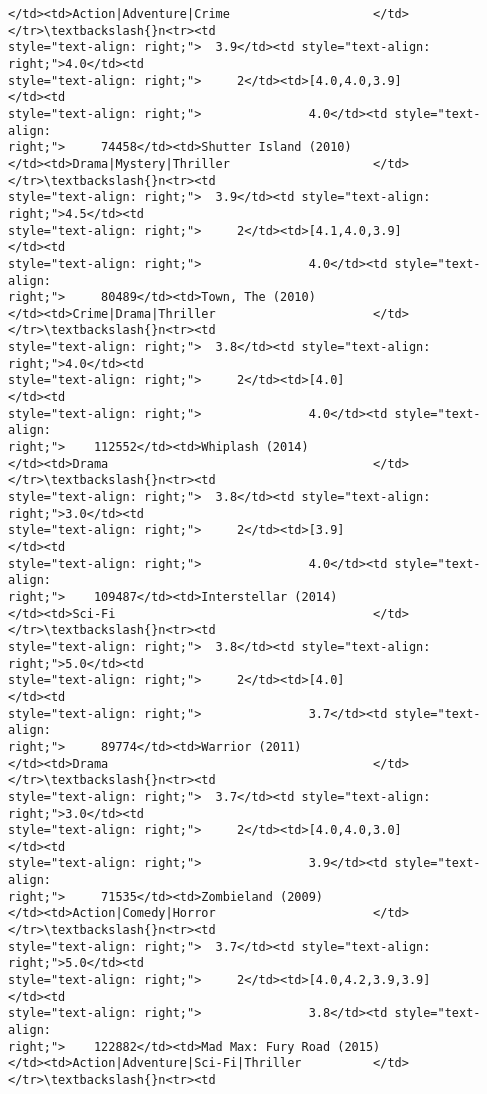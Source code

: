 \documentclass[11pt]{article}
\begin{document}
\begin{tcolorbox}[breakable, size=fbox, boxrule=.5pt, pad at break*=1mm, opacityfill=0]
\begin{Verbatim}[commandchars=\\\{\}]
</td><td>Action|Adventure|Crime                    </td></tr>\textbackslash{}n<tr><td
style="text-align: right;">  3.9</td><td style="text-align: right;">4.0</td><td
style="text-align: right;">     2</td><td>[4.0,4.0,3.9]            </td><td
style="text-align: right;">               4.0</td><td style="text-align:
right;">     74458</td><td>Shutter Island (2010)
</td><td>Drama|Mystery|Thriller                    </td></tr>\textbackslash{}n<tr><td
style="text-align: right;">  3.9</td><td style="text-align: right;">4.5</td><td
style="text-align: right;">     2</td><td>[4.1,4.0,3.9]            </td><td
style="text-align: right;">               4.0</td><td style="text-align:
right;">     80489</td><td>Town, The (2010)
</td><td>Crime|Drama|Thriller                      </td></tr>\textbackslash{}n<tr><td
style="text-align: right;">  3.8</td><td style="text-align: right;">4.0</td><td
style="text-align: right;">     2</td><td>[4.0]                    </td><td
style="text-align: right;">               4.0</td><td style="text-align:
right;">    112552</td><td>Whiplash (2014)
</td><td>Drama                                     </td></tr>\textbackslash{}n<tr><td
style="text-align: right;">  3.8</td><td style="text-align: right;">3.0</td><td
style="text-align: right;">     2</td><td>[3.9]                    </td><td
style="text-align: right;">               4.0</td><td style="text-align:
right;">    109487</td><td>Interstellar (2014)
</td><td>Sci-Fi                                    </td></tr>\textbackslash{}n<tr><td
style="text-align: right;">  3.8</td><td style="text-align: right;">5.0</td><td
style="text-align: right;">     2</td><td>[4.0]                    </td><td
style="text-align: right;">               3.7</td><td style="text-align:
right;">     89774</td><td>Warrior (2011)
</td><td>Drama                                     </td></tr>\textbackslash{}n<tr><td
style="text-align: right;">  3.7</td><td style="text-align: right;">3.0</td><td
style="text-align: right;">     2</td><td>[4.0,4.0,3.0]            </td><td
style="text-align: right;">               3.9</td><td style="text-align:
right;">     71535</td><td>Zombieland (2009)
</td><td>Action|Comedy|Horror                      </td></tr>\textbackslash{}n<tr><td
style="text-align: right;">  3.7</td><td style="text-align: right;">5.0</td><td
style="text-align: right;">     2</td><td>[4.0,4.2,3.9,3.9]        </td><td
style="text-align: right;">               3.8</td><td style="text-align:
right;">    122882</td><td>Mad Max: Fury Road (2015)
</td><td>Action|Adventure|Sci-Fi|Thriller          </td></tr>\textbackslash{}n<tr><td

\end{Verbatim}
\end{tcolorbox}
\end{document}
